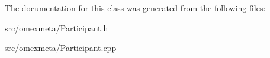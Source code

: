 The documentation for this class was generated from the following files\+:\begin{DoxyCompactItemize}
\item 
src/omexmeta/Participant.\+h\item 
src/omexmeta/Participant.\+cpp\end{DoxyCompactItemize}
